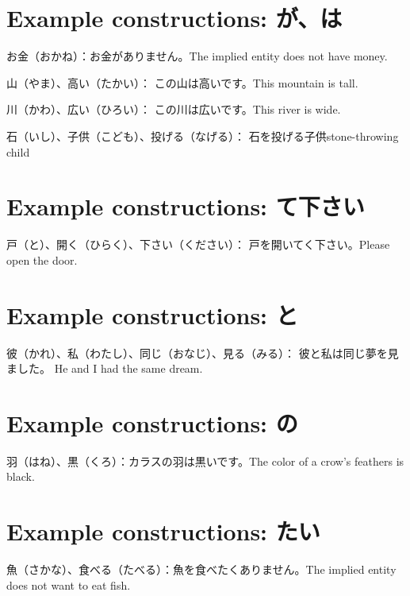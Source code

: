 \section{Example constructions: が、は}

お金（おかね）：お金がありません。The implied entity does not have money.

山（やま）、高い（たかい）：
この山は高いです。This mountain is tall.

川（かわ）、広い（ひろい）：
この川は広いです。This river is wide.

石（いし）、子供（こども）、投げる（なげる）：
石を投げる子供stone-throwing child

\section{Example constructions: て下さい}

戸（と）、開く（ひらく）、下さい（ください）：
戸を開いてく下さい。Please open the door.

\section{Example constructions: と}

彼（かれ）、私（わたし）、同じ（おなじ）、見る（みる）：
彼と私は同じ夢を見ました。
He and I had the same dream.

\section{Example constructions: の}

羽（はね）、黒（くろ）：カラスの羽は黒いです。The color of a crow's feathers is black.

\section{Example constructions: たい}

魚（さかな）、食べる（たべる）：魚を食べたくありません。The implied entity does not want to eat fish.
